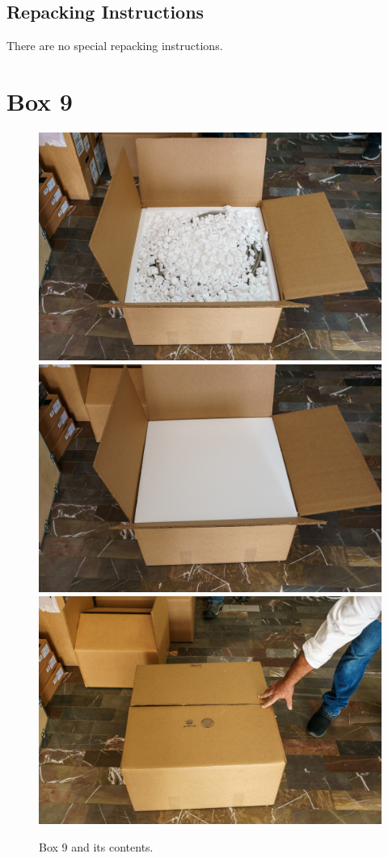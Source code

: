 \documentclass{article}
\begin{document}
\subsection{Repacking Instructions}

There are no special repacking instructions.


\clearpage
\section{Box 9}

\begin{figure}[bp]
\begin{center}
\includegraphics[width=0.60\linewidth]{figures/20201209T115319.jpg}\\[\smallskipamount]
\includegraphics[width=0.60\linewidth]{figures/20201209T115331.jpg}\\[\smallskipamount]
\includegraphics[width=0.60\linewidth]{figures/20201209T115337.jpg}
\end{center}
\caption{Box 9 and its contents.}
\label{figure:box-nine}
\end{figure}
\end{document}
